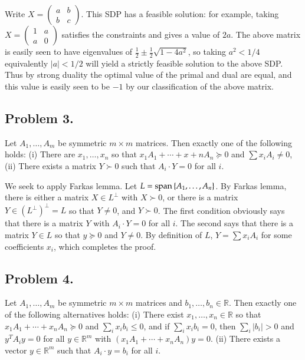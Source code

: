 \documentclass[12pt]{article}
\theoremstyle{definitionstyle}
\def\mbb#1{\mathbb{#1}}
\def\R{\mbb{R}}
\newcommand{\SET}[1]{\Set{\mskip-\medmuskip #1 \mskip-\medmuskip}}
\begin{document}
    Write $X = \begin{pmatrix}
        a & b \\ 
        b & c
    \end{pmatrix}$. This SDP has a feasible solution: for example, taking $X = \begin{pmatrix}
        1 & a \\ 
        a & 0
    \end{pmatrix}$ satisfies the constraints and gives a value of $2a$. The above matrix is easily seen to have eigenvalues of $\frac12 \pm \frac12 \sqrt{1-4a^2}$, so taking $a^2 < 1/4$ equivalently $|a| < 1/2$ will yield a strictly feasible solution to the above SDP. Thus by strong duality the optimal value of the primal and dual are equal, and this value is easily seen to be $-1$ by our classification of the above matrix.

    \subsection*{Problem 3.}
    Let $A_1, \ldots, A_m$ be symmetric $m \times m$ matrices. Then exactly one of the following holds: (i) There are $x_1, \ldots, x_n$ so that $x_1A_1 + \cdots + x+nA_n \succeq 0$ and $\sum x_iA_i \neq 0$, (ii) There exists a matrix $Y \succ 0$ such that $A_i \cdot Y = 0$ for all $i$.

    We seek to apply Farkas lemma. Let $L = \mathrm{span}\SET{A_1, \ldots, A_n}$. By Farkas lemma, there is either a matrix $X \in L^\perp$ with $X \succ 0$, or there is a matrix $Y \in (L^\perp)^\perp = L$ so that $Y \neq 0$, and $Y \succ 0$. The first condition obviously says that there is a matrix $Y$ with $A_i \cdot Y = 0$ for all $i$. The second says that there is a matrix $Y \in L$ so that $y \succeq 0$ and $Y \neq 0$. By definition of $L$, $Y = \sum x_iA_i$ for some coefficients $x_i$, which completes the proof.

    \subsection*{Problem 4.}
    Let $A_1, \ldots, A_m$ be symmetric $m \times m$ matrices and $b_1, \ldots, b_n \in \R$. Then exactly one of the following alternatives holds: (i) There exist $x_1, \ldots, x_n \in \R$ so that $x_1A_1 + \cdots + x_nA_n \succeq 0$ and $\sum_i x_ib_i \leq 0$, and if $\sum_i x_ib_i = 0$, then $\sum_i |b_i| > 0$ and $y^TA_iy = 0$ for all $y \in \R^m$ with $(x_1A_1 + \cdots + x_nA_n)y = 0$. (ii) There exists a vector $y \in \R^m$ such that $A_i \cdot y = b_i$ for all $i$.
\end{document}

